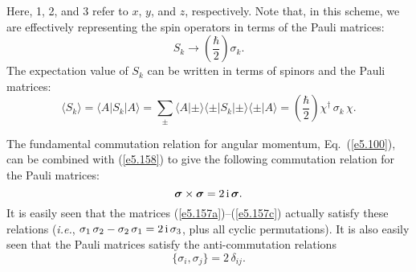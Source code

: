 Here, 1, 2, and 3 refer to $x$, $y$, and $z$, respectively. Note that, in this
scheme, we are effectively representing the spin operators in terms
of the Pauli matrices:
\begin{equation}\label{e5.158}
S_k \rightarrow \left(\frac{\hbar}{2} \right)\sigma_k.
\end{equation}
The expectation value of $S_k$ can be written in terms of spinors
and the Pauli matrices:
\begin{equation}\label{e5.159}
\langle S_k \rangle = \langle A|S_k |A\rangle = \sum_\pm
\langle A|\pm \rangle \langle \pm |S_k|\pm \rangle \langle \pm |A\rangle
= \left(\frac{\hbar}{2}\right) \chi^{\dag}\, \sigma_k\, \chi.
\end{equation}

The fundamental commutation relation for angular momentum, Eq.~(\ref{e5.100}), can
be combined with (\ref{e5.158}) to give the following commutation relation
for the Pauli matrices:
\begin{equation}\label{e5.160}
\mbox{\boldmath$\sigma$}\times \mbox{\boldmath$\sigma$} = 2\,{\rm i}\,\mbox{\boldmath$\sigma$}.
\end{equation}
It is easily seen that the matrices (\ref{e5.157a})--(\ref{e5.157c}) actually satisfy these relations
({\em i.e.},  $\sigma_1\, \sigma_2 - \sigma_2\,\sigma_1 = 2\,{\rm i} \,\sigma_3$, plus
all cyclic permutations). It is also easily seen that the Pauli matrices
satisfy the anti-commutation relations
\begin{equation}\label{e5.161}
\{ \sigma_i, \sigma_j \} = 2 \,\delta_{ij}.
\end{equation}

